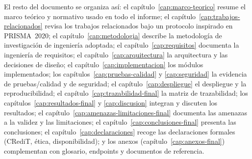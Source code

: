 El resto del documento se organiza as\'i: el cap\'itulo~\ref{cap:marco-teorico}
resume el marco te\'orico y normativo usado en todo el informe; el
cap\'itulo~\ref{cap:trabajos-relacionados}
revisa los trabajos relacionados bajo un protocolo inspirado en
PRISMA~2020; el cap\'itulo~\ref{cap:metodologia} describe la metodolog\'ia
de investigaci\'on de ingenier\'ia adoptada; el cap\'itulo~\ref{cap:requisitos}
documenta la ingenier\'ia de requisitos; el cap\'itulo~\ref{cap:arquitectura}
la arquitectura y las decisiones de dise\~no; el cap\'itulo~\ref{cap:implementacion}
los m\'odulos implementados; los cap\'itulos~\ref{cap:pruebas-calidad} y
\ref{cap:seguridad} la evidencia de pruebas/calidad y de seguridad; el
cap\'itulo~\ref{cap:despliegue} el despliegue y la reproducibilidad; el
cap\'itulo~\ref{cap:trazabilidad-final} la matriz de trazabilidad; los
cap\'itulos~\ref{cap:resultados-final} y \ref{cap:discusion} integran y
discuten los resultados; el cap\'itulo~\ref{cap:amenazas-limitaciones-final}
documenta las amenazas a la validez y las limitaciones; el
cap\'itulo~\ref{cap:conclusiones-final} presenta las conclusiones; el
cap\'itulo~\ref{cap:declaraciones} recoge las declaraciones formales
(CRediT, \'etica, disponibilidad); y los anexos
(cap\'itulo~\ref{cap:anexos-final}) complementan con glosario, endpoints y
documentos de referencia.
